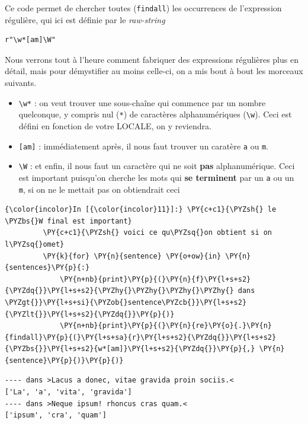     Ce code permet de chercher toutes (\texttt{findall}) les occurrences de
l'expression régulière, qui ici est définie par le \emph{raw-string}

\begin{verbatim}
r"\w*[am]\W"
\end{verbatim}

Nous verrons tout à l'heure comment fabriquer des expressions régulières
plus en détail, mais pour démystifier au moins celle-ci, on a mis bout à
bout les morceaux suivants.

\begin{itemize}
	\item 
	\texttt{\textbackslash{}w*} : on veut
	trouver une sous-chaîne qui commence par un nombre quelconque, y compris
	nul (\texttt{*}) de caractères alphanumériques
	(\texttt{\textbackslash{}w}). Ceci est défini en fonction de votre
	LOCALE, on y reviendra.
	\item
	\texttt{{[}am{]}} : immédiatement après, il
	nous faut trouver un caratère \texttt{a} ou \texttt{m}.
	\item
	\texttt{\textbackslash{}W} : et enfin, il nous faut un caractère qui ne
	soit \textbf{pas} alphanumérique. Ceci est important puisqu'on cherche
	les mots qui \textbf{se terminent} par un \texttt{a} ou un \texttt{m},
	si on ne le mettait pas on obtiendrait ceci
\end{itemize}

    \begin{Verbatim}[commandchars=\\\{\}]
{\color{incolor}In [{\color{incolor}11}]:} \PY{c+c1}{\PYZsh{} le \PYZbs{}W final est important}
         \PY{c+c1}{\PYZsh{} voici ce qu\PYZsq{}on obtient si on l\PYZsq{}omet}
         \PY{k}{for} \PY{n}{sentence} \PY{o+ow}{in} \PY{n}{sentences}\PY{p}{:}
             \PY{n+nb}{print}\PY{p}{(}\PY{n}{f}\PY{l+s+s2}{\PYZdq{}}\PY{l+s+s2}{\PYZhy{}\PYZhy{}\PYZhy{}\PYZhy{} dans \PYZgt{}}\PY{l+s+si}{\PYZob{}sentence\PYZcb{}}\PY{l+s+s2}{\PYZlt{}}\PY{l+s+s2}{\PYZdq{}}\PY{p}{)}
             \PY{n+nb}{print}\PY{p}{(}\PY{n}{re}\PY{o}{.}\PY{n}{findall}\PY{p}{(}\PY{l+s+sa}{r}\PY{l+s+s2}{\PYZdq{}}\PY{l+s+s2}{\PYZbs{}}\PY{l+s+s2}{w*[am]}\PY{l+s+s2}{\PYZdq{}}\PY{p}{,} \PY{n}{sentence}\PY{p}{)}\PY{p}{)}
\end{Verbatim}


    \begin{Verbatim}[commandchars=\\\{\}]
---- dans >Lacus a donec, vitae gravida proin sociis.<
['La', 'a', 'vita', 'gravida']
---- dans >Neque ipsum! rhoncus cras quam.<
['ipsum', 'cra', 'quam']

    \end{Verbatim}

